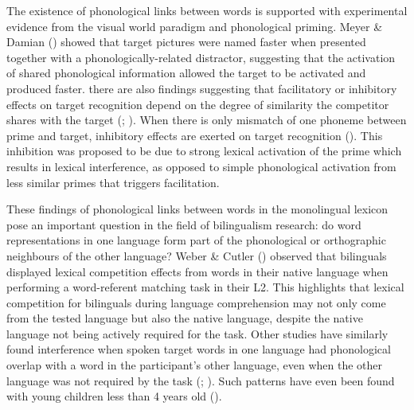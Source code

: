 \documentclass[
]{article}
\begin{document}
The existence of phonological links between words is supported with
experimental evidence from the visual world paradigm and phonological
priming. Meyer \& Damian ()
showed that target pictures were named faster when presented together
with a phonologically-related distractor, suggesting that the activation
of shared phonological information allowed the target to be activated
and produced faster. there are also findings suggesting that
facilitatory or inhibitory effects on target recognition depend on the
degree of similarity the competitor shares with the target
(;
). When there is only mismatch of one phoneme between prime and
target, inhibitory effects are exerted on target recognition
(). This
inhibition was proposed to be due to strong lexical activation of the
prime which results in lexical interference, as opposed to simple
phonological activation from less similar primes that triggers
facilitation.

These findings of phonological links between words in the monolingual
lexicon pose an important question in the field of bilingualism
research: do word representations in one language form part of the
phonological or orthographic neighbours of the other language? Weber \&
Cutler () observed that bilinguals
displayed lexical competition effects from words in their native
language when performing a word-referent matching task in their L2. This
highlights that lexical competition for bilinguals during language
comprehension may not only come from the tested language but also the
native language, despite the native language not being actively required
for the task. Other studies have similarly found interference when
spoken target words in one language had phonological overlap with a word
in the participant's other language, even when the other language was
not required by the task (; ).
Such patterns have even been found with young children less than 4 years
old ().
\end{document}

